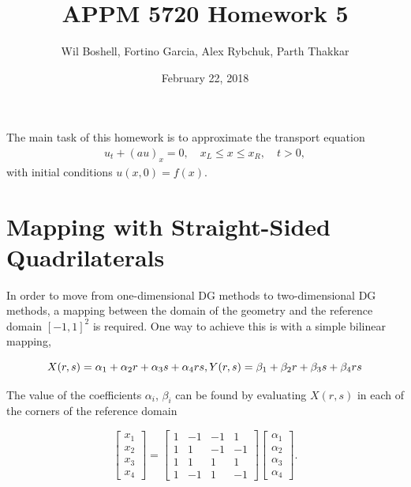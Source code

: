 \documentclass{article}
\title{APPM 5720 Homework 5}
\author{Wil Boshell, Fortino Garcia, Alex Rybchuk, Parth Thakkar}
\date{February 22, 2018}
\begin{document}
\maketitle

\maketitle

\noindent The main task of this homework is to approximate the transport equation
	\begin{align*}
		u_t + \left( a u\right)_x = 0, \quad x_L \leq x \leq x_R, \quad t > 0,
	\end{align*}
with initial conditions $u(x,0) = f(x)$.

\section{Mapping with Straight-Sided Quadrilaterals}
In order to move from one-dimensional DG methods to two-dimensional DG methods, a mapping between the domain of the geometry and the reference domain $[-1,1]^2$ is required. One way to achieve this is with a simple bilinear mapping,

\begin{equation}
X(r,s) = \alpha_1 + \alpha_2r + \alpha_3s + \alpha_4rs, \\
Y(r,s) = \beta_1 + \beta_2r + \beta_3s + \beta_4rs
\end{equation} 

The value of the coefficients $\alpha_i$, $\beta_i$ can be found by evaluating $X(r,s)$ in each of the corners of the reference domain

\begin{equation}
    \begin{bmatrix}
      x_1 \\
      x_2 \\
      x_3 \\
      x_4 
    \end{bmatrix}
    =     
    \begin{bmatrix}
      1 & -1 & -1 & 1 \\
      1 & 1 & -1 & -1 \\
      1 & 1 & 1 & 1 \\
      1 & -1 & 1 & -1
    \end{bmatrix}
    \begin{bmatrix}
      \alpha_1 \\
      \alpha_2 \\
      \alpha_3 \\
      \alpha_4 
    \end{bmatrix}.
\end{equation}
\end{document}
